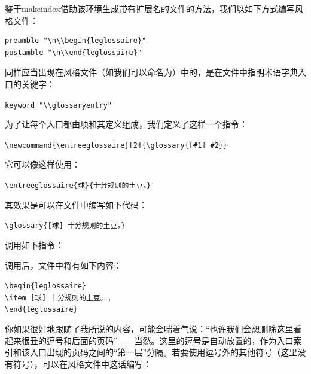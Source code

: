 鉴于\textsf{makeindex}借助该环境生成带有扩展名的文件的方法，我们以如下方式编写风格文件：

\begin{dmd}
\begin{verbatim}
preamble "\n\\begin{leglossaire}"
postamble "\n\\end{leglossaire}"
\end{verbatim}
\end{dmd}

同样应当出现在风格文件（如我们可以命名为）中的，是在文件中指明术语字典入口的关键字：

\begin{dmd}
\verb|keyword "\\glossaryentry"|
\end{dmd}

为了让每个入口都由项和其定义组成，我们定义了这样一个指令：

\begin{dmd}
\verb|\newcommand{\entreeglossaire}[2]{\glossary{[#1] #2}}|
\end{dmd}

它可以像这样使用：

\begin{dmd}
\verb|\entreeglossaire{球}{十分规则的土豆。}|
\end{dmd}

其效果是可以在文件中编写如下代码：

\begin{dmd}
\verb|\glossary{[球] 十分规则的土豆。}|
\end{dmd}

调用如下指令：


调用后，文件中将有如下内容：

\begin{dmd}
\verb+\begin{leglossaire}+\\
\verb+\item [球] 十分规则的土豆。, + \\
\verb+\end{leglossaire}+
\end{dmd}

你如果很好地跟随了我所说的内容，可能会喘着气说：“也许我们会想删除这里看起来很丑的逗号和后面的页码”——当然。这里的逗号是自动放置的，作为入口索引和该入口出现的页码之间的“第一层”分隔。若要使用逗号外的其他符号（这里没有符号），可以在风格文件中这话编写：

